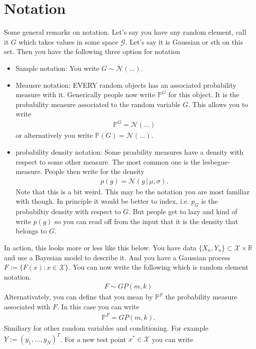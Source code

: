 \documentclass{article}
\newcommand{\bbP}{\mathbb{P}}
\newcommand{\bbR}{\mathbb{R}}
\numberwithin{equation}{section}
\begin{document}
\section{Notation}
Some general remarks on notation. Let's say you have any random element, call it $G$ which takes values in some space $\mathcal{G}$. Let's say it is Gaussian or sth on this set. Then you have the following three option for notation
\begin{itemize}
    \item Sample notation: You write $G \sim \mathcal{N}(...)$. 
    \item Meausre notation: EVERY random objects has an associated probability measure with it. Generically people now write $\mathbb{P}^G$ for this object. It is the probability measure associated to the random variable $G$. This allows you to write
    \begin{align}
        \mathbb{P}^G = \mathcal{N}(...)
    \end{align}
    or alternatively you write $\mathbb{P}(G) = \mathcal{N}(...)$. 
    \item probability density notation: Some proability measures have a density with respect to some other measure. The most common one is the lesbegue-measure. People then write for the density
    \begin{align}
        p(g) = \mathcal{N}(g \, | \, \mu, \sigma).
    \end{align}
    Note that this is a bit weird. This may be the notation you are most familiar with though. In principle it would be better to index, i.e. $p_G$ is the probabiltiy density with respect to $G$. But people get to lazy and kind of write $p(g)$ so you can read off from the input that it is the density that belongs to $G$.
\end{itemize}
In action, this looks more or less like this below.
You have data $\{X_n, Y_n\} \subset \mathcal{X} \times \bbR$ and use a Bayesian model to describe it. And you have a Gaussian process $ F:= \{ F(x) : x \in \mathcal{X}\}$. You can now write the following which is random element notation.
\begin{align}
    F \sim GP(m, k)
\end{align}
Alternativately, you can define that you mean by $\bbP^F$ the probability measure associated with $F$. In this case you can write
\begin{align}
    \mathbb{P}^F = GP(m,k).
\end{align}
Similiary for other random variables and conditioning. For example $Y:=(y_1, \hdots, y_N)^T$. For a new test point $x^* \in \mathcal{X}$ you can write 
\end{document}
